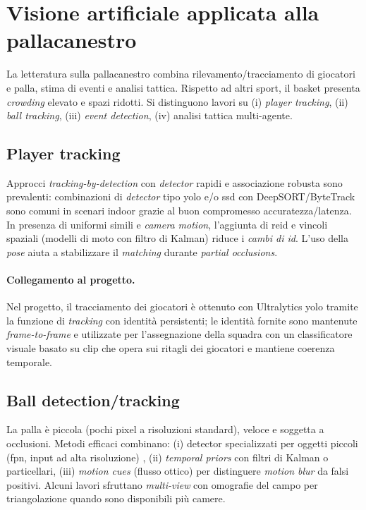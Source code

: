 \documentclass[12pt,a4paper,openright,twoside]{book}
\begin{document}
\section{Visione artificiale applicata alla pallacanestro}
\label{sec:cv-applicata-basket}

La letteratura sulla pallacanestro combina rilevamento/tracciamento 
di giocatori e palla, stima di eventi e analisi tattica.
Rispetto ad altri sport, il basket presenta \emph{crowding} elevato 
e spazi ridotti. Si distinguono lavori su (i) \emph{player tracking}, 
(ii) \emph{ball tracking}, (iii) \emph{event detection}, 
(iv) analisi tattica multi-agente.

\subsection{Player tracking}
Approcci \emph{tracking-by-detection} con \emph{detector} rapidi e associazione 
robusta sono prevalenti: combinazioni di \emph{detector} tipo 
\ac{yolo} e/o \ac{ssd} con DeepSORT/ByteTrack sono comuni in scenari indoor grazie 
al buon compromesso accuratezza/latenza. In presenza di uniformi simili e 
\emph{camera motion}, l'aggiunta di \ac{reid} e vincoli spaziali (modelli di 
moto con filtro di Kalman) riduce i \emph{cambi di \ac{id}}. L'uso della
\emph{pose} aiuta a stabilizzare il \emph{matching} durante \emph{partial occlusions}.

\paragraph{Collegamento al progetto.} Nel progetto, il tracciamento dei giocatori 
è ottenuto con Ultralytics \ac{yolo} tramite la funzione di \emph{tracking} con identità 
persistenti; le identità fornite sono mantenute \emph{frame-to-frame} e utilizzate 
per l'assegnazione della squadra con un classificatore visuale basato su \ac{clip} 
\cite{Chen2024ContrastiveLocalized} che opera sui ritagli dei giocatori e mantiene 
coerenza temporale.

\subsection{Ball detection/tracking}
La palla è piccola (pochi pixel a risoluzioni standard), veloce e soggetta 
a occlusioni. Metodi efficaci combinano: (i) detector specializzati per 
oggetti piccoli (\ac{fpn}, input ad alta risoluzione) \cite{Chen2009Physics}, 
(ii) \emph{temporal priors} con filtri di Kalman o particellari, 
(iii) \emph{motion cues} (flusso ottico) per distinguere \emph{motion blur} 
da falsi positivi. Alcuni lavori sfruttano \emph{multi-view} con omografie 
del campo per triangolazione quando sono disponibili più camere.
\end{document}
